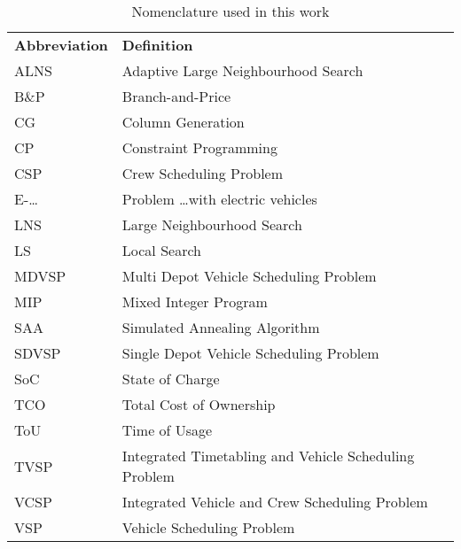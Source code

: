 \documentclass[]{article}
\begin{document}
\begin{table}[h]
  \centering
  \begin{tabular}{ll}
    \toprule
    \multicolumn{1}{l}{\textbf{Abbreviation}} & \multicolumn{1}{l}{\textbf{Definition}}               \\
    \cmidrule(lr){1-1}\cmidrule(lr){2-2}
    ALNS                                      & Adaptive Large Neighbourhood Search                   \\
    B\&P                                      & Branch-and-Price                                      \\
    CG                                        & Column Generation                                     \\
    CP                                        & Constraint Programming                                \\
    CSP                                       & Crew Scheduling Problem                               \\
    E-\dots                                   & Problem \dots with electric vehicles                  \\
    LNS                                       & Large Neighbourhood Search                            \\
    LS                                        & Local Search                                          \\
    MDVSP                                     & Multi Depot Vehicle Scheduling Problem                \\
    MIP                                       & Mixed Integer Program                                 \\
    SAA                                       & Simulated Annealing Algorithm                         \\
    SDVSP                                     & Single Depot Vehicle Scheduling Problem               \\
    SoC                                       & State of Charge                                       \\
    TCO                                       & Total Cost of Ownership                               \\
    ToU                                       & Time of Usage                                         \\
    TVSP                                      & Integrated Timetabling and Vehicle Scheduling Problem \\
    VCSP                                      & Integrated Vehicle and Crew Scheduling Problem        \\
    VSP                                       & Vehicle Scheduling Problem                            \\
    \bottomrule
  \end{tabular}
  \caption{Nomenclature used in this work}
\end{table}
\end{document}
